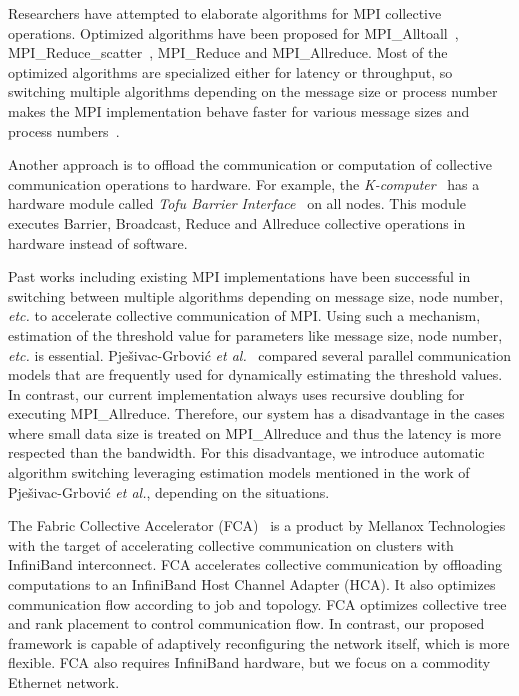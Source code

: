 Researchers have attempted to elaborate algorithms for MPI collective
operations. Optimized algorithms have been proposed for
MPI\_Alltoall~\autocite{Bruck1997},
MPI\_Reduce\_scatter~\autocite{Iannello1997}, MPI\_Reduce and MPI\_Allreduce.
Most of the optimized algorithms are specialized either for latency or
throughput, so switching multiple algorithms depending on the message size or
process number makes the MPI implementation behave faster for various message
sizes and process numbers~\autocite{Thakur2005}.

Another approach is to offload the communication or computation of collective
communication operations to hardware. For example, the
\emph{K-computer}~\autocite{Yokokawa2011} has a hardware module called
\emph{Tofu Barrier Interface}~\autocite{Ajima2012} on all nodes. This module
executes Barrier, Broadcast, Reduce and Allreduce collective operations in
hardware instead of software.

Past works including existing MPI implementations have been successful
in switching between multiple algorithms depending on message size, node
number, \emph{etc.} to accelerate collective communication of MPI\@. Using
such a mechanism, estimation of the threshold value for parameters like
message size, node number, \emph{etc.} is essential. Pje\v{s}ivac-Grbovi\'{c}
\emph{et al.}~\autocite{PjesivacGrbovic2007} compared several parallel
communication models that are frequently used for dynamically estimating the
threshold values. In contrast, our current implementation always uses
recursive doubling for executing MPI\_Allreduce. Therefore, our system has a
disadvantage in the cases where small data size is treated on MPI\_Allreduce
and thus the latency is more respected than the bandwidth. For this
disadvantage, we introduce automatic algorithm switching leveraging estimation
models mentioned in the work of Pje\v{s}ivac-Grbovi\'{c} \emph{et al.},
depending on the situations.

The Fabric Collective Accelerator (FCA)~\autocite{fca} is a product by
Mellanox Technologies with the target of accelerating collective
communication on clusters with InfiniBand interconnect. FCA accelerates
collective communication by offloading computations to an InfiniBand
Host Channel Adapter (HCA). It also optimizes communication flow
according to job and topology. FCA optimizes collective tree and rank
placement to control communication flow. In contrast, our proposed
framework is capable of adaptively reconfiguring the network itself,
which is more flexible. FCA also requires InfiniBand hardware, but we
focus on a commodity Ethernet network.

